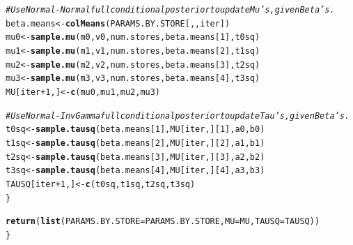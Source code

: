 \documentclass[12pt,letterpaper]{article}\usepackage[]{graphicx}\usepackage[]{color}
\makeatletter
\newcommand{\hlnum}[1]{\textcolor[rgb]{0.686,0.059,0.569}{#1}}%
\newcommand{\hlcom}[1]{\textcolor[rgb]{0.678,0.584,0.686}{\textit{#1}}}%
\newcommand{\hlopt}[1]{\textcolor[rgb]{0,0,0}{#1}}%
\newcommand{\hlstd}[1]{\textcolor[rgb]{0.345,0.345,0.345}{#1}}%
\newcommand{\hlkwb}[1]{\textcolor[rgb]{0.69,0.353,0.396}{#1}}%
\newcommand{\hlkwc}[1]{\textcolor[rgb]{0.333,0.667,0.333}{#1}}%
\newcommand{\hlkwd}[1]{\textcolor[rgb]{0.737,0.353,0.396}{\textbf{#1}}}%
\newenvironment{kframe}{%
 \def\at@end@of@kframe{}%
 \ifinner\ifhmode%
  \def\at@end@of@kframe{\end{minipage}}%
  \begin{minipage}{\columnwidth}%
 \fi\fi%
 \def\FrameCommand##1{\hskip\@totalleftmargin \hskip-\fboxsep
 \colorbox{shadecolor}{##1}\hskip-\fboxsep
     \hskip-\linewidth \hskip-\@totalleftmargin \hskip\columnwidth}%
 \MakeFramed {\advance\hsize-\width
   \@totalleftmargin\z@ \linewidth\hsize
   \@setminipage}}%
 {\par\unskip\endMakeFramed%
 \at@end@of@kframe}
\newenvironment{knitrout}{}{} %
\makeatother
\begin{document}
\begin{knitrout}
\begin{kframe}
\begin{alltt}
    \hlcom{# Use Normal-Normal full conditional posterior to update Mu's, given Beta's.}
    \hlstd{beta.means} \hlkwb{<-} \hlkwd{colMeans}\hlstd{(PARAMS.BY.STORE[,,iter])}
    \hlstd{mu0} \hlkwb{<-} \hlkwd{sample.mu}\hlstd{(m0, v0, num.stores, beta.means[}\hlnum{1}\hlstd{], t0sq)}
    \hlstd{mu1} \hlkwb{<-} \hlkwd{sample.mu}\hlstd{(m1, v1, num.stores, beta.means[}\hlnum{2}\hlstd{], t1sq)}
    \hlstd{mu2} \hlkwb{<-} \hlkwd{sample.mu}\hlstd{(m2, v2, num.stores, beta.means[}\hlnum{3}\hlstd{], t2sq)}
    \hlstd{mu3} \hlkwb{<-} \hlkwd{sample.mu}\hlstd{(m3, v3, num.stores, beta.means[}\hlnum{4}\hlstd{], t3sq)}
    \hlstd{MU[iter}\hlopt{+}\hlnum{1}\hlstd{,]} \hlkwb{<-} \hlkwd{c}\hlstd{(mu0, mu1, mu2, mu3)}

    \hlcom{# Use Normal-InvGamma full conditional posterior to update Tau's, given Beta's.}
    \hlstd{t0sq} \hlkwb{<-} \hlkwd{sample.tausq}\hlstd{(beta.means[}\hlnum{1}\hlstd{], MU[iter,][}\hlnum{1}\hlstd{], a0, b0)}
    \hlstd{t1sq} \hlkwb{<-} \hlkwd{sample.tausq}\hlstd{(beta.means[}\hlnum{2}\hlstd{], MU[iter,][}\hlnum{2}\hlstd{], a1, b1)}
    \hlstd{t2sq} \hlkwb{<-} \hlkwd{sample.tausq}\hlstd{(beta.means[}\hlnum{3}\hlstd{], MU[iter,][}\hlnum{3}\hlstd{], a2, b2)}
    \hlstd{t3sq} \hlkwb{<-} \hlkwd{sample.tausq}\hlstd{(beta.means[}\hlnum{4}\hlstd{], MU[iter,][}\hlnum{4}\hlstd{], a3, b3)}
    \hlstd{TAUSQ[iter}\hlopt{+}\hlnum{1}\hlstd{,]} \hlkwb{<-} \hlkwd{c}\hlstd{(t0sq, t1sq, t2sq, t3sq)}
  \hlstd{\}}

  \hlkwd{return} \hlstd{(}\hlkwd{list}\hlstd{(}\hlkwc{PARAMS.BY.STORE}\hlstd{=PARAMS.BY.STORE,} \hlkwc{MU}\hlstd{=MU,} \hlkwc{TAUSQ}\hlstd{=TAUSQ))}
\hlstd{\}}


\end{alltt}
\end{kframe}
\end{knitrout}
\end{document}
